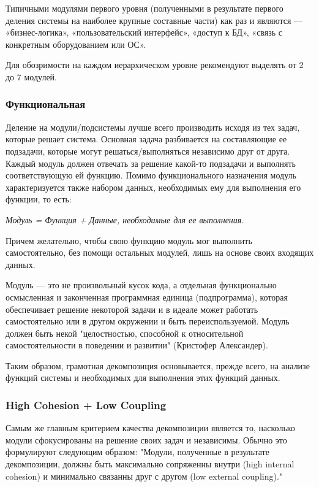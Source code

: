 \documentclass[a4paper]{article}
\begin{document}
Типичными модулями первого уровня (полученными в результате первого деления системы на наиболее крупные составные части) как раз и являются — «бизнес-логика», «пользовательский интерфейс», «доступ к БД», «связь с конкретным оборудованием или ОС».

Для обозримости на каждом иерархическом уровне рекомендуют выделять от 2 до 7 модулей.

\subsubsection{Функциональная}

Деление на модули/подсистемы лучше всего производить исходя из тех задач, которые решает система. Основная задача разбивается на составляющие ее подзадачи, которые могут решаться/выполняться независимо друг от друга. Каждый модуль должен отвечать за решение какой-то подзадачи и выполнять соответствующую ей функцию. Помимо функционального назначения модуль характеризуется также набором данных, необходимых ему для выполнения его функции, то есть:

\textit{Модуль = Функция + Данные, необходимые для ее выполнения.}

Причем желательно, чтобы свою функцию модуль мог выполнить самостоятельно, без помощи остальных модулей, лишь на основе своих входящих данных.

Модуль — это не произвольный кусок кода, а отдельная функционально осмысленная и законченная программная единица (подпрограмма), которая обеспечивает решение некоторой задачи и в идеале может работать самостоятельно или в другом окружении и быть переиспользуемой. Модуль должен быть некой "целостностью, способной к относительной самостоятельности в поведении и развитии" (Кристофер Александер).

Таким образом, грамотная декомпозиция основывается, прежде всего, на анализе функций системы и необходимых для выполнения этих функций данных.

\subsubsection{High Cohesion + Low Coupling}

Самым же главным критерием качества декомпозиции является то, насколько модули сфокусированы на решение своих задач и независимы. Обычно это формулируют следующим образом: "Модули, полученные в результате декомпозиции, должны быть максимально сопряженны внутри (high internal cohesion) и минимально связанны друг с другом (low external coupling)."
\end{document}
